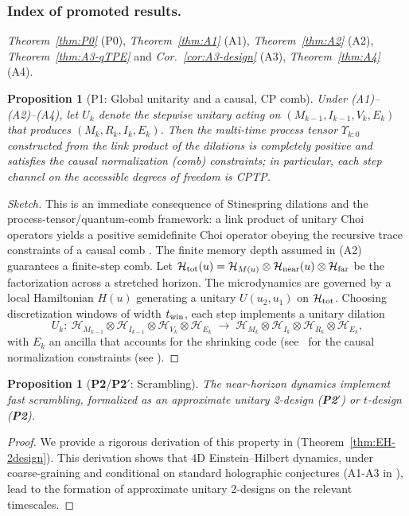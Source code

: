 \documentclass[aps,prd,preprint,onecolumn,superscriptaddress,nofootinbib,longbibliography,floatfix,11pt,showpacs,showkeys]{revtex4-2}
\newcommand{\Ptwo}{\textbf{P2}\xspace}
\newcommand{\PtwoPrime}{\textbf{P2$'$}\xspace}
\theoremstyle{plain}
\newtheorem{proposition}[theorem]{Proposition}
\theoremstyle{definition}
\theoremstyle{remark}
\begin{document}
\subsubsection{Index of promoted results.}
\textit{Theorem~\ref{thm:P0}} (P0), 
\textit{Theorem~\ref{thm:A1}} (A1),
\textit{Theorem~\ref{thm:A2}} (A2),
\textit{Theorem~\ref{thm:A3-qTPE}} and \textit{Cor.~\ref{cor:A3-design}} (A3),
\textit{Theorem~\ref{thm:A4}} (A4).


\begin{proposition}[P1: Global unitarity and a causal, CP comb]
\label{prop:P1-CP}
Under (A1)--(A2)--(A4), let $U_k$ denote the stepwise unitary acting on $(M_{k-1},I_{k-1},V_k,E_k)$ that produces $(M_k,R_k,I_k,E_k)$.
Then the multi-time process tensor $\Upsilon_{k:0}$ constructed from the link product of the dilations is completely positive and
satisfies the causal normalization (comb) constraints; in particular, each step channel on the accessible degrees of freedom is CPTP.
\end{proposition}
\begin{proof}[Sketch]
This is an immediate consequence of Stinespring dilations and the process-tensor/quantum-comb framework: a link product of unitary
Choi operators yields a positive semidefinite Choi operator obeying the recursive trace constraints of a causal comb
\cite{Chiribella:2009, Pollock:2018, Petz:1986}. The finite memory depth assumed in (A2) guarantees a finite-step comb.
Let $\mathcal{H}_{\rm tot}(u)=\mathcal{H}_{M(u)}\otimes\mathcal{H}_{\rm near}(u)\otimes\mathcal{H}_{\rm far}$ be the factorization across a stretched horizon. The microdynamics are governed by a local Hamiltonian $H(u)$ generating a unitary $U(u_2,u_1)$ on $\mathcal{H}_{\rm tot}$. Choosing discretization windows of width $t_{\rm win}$, each step implements a unitary dilation
\begin{equation}
U_k:\ \mathcal{H}_{M_{k-1}}\otimes\mathcal{H}_{I_{k-1}}\otimes\mathcal{H}_{V_k}\otimes\mathcal{H}_{E_k}
\;\longrightarrow\;
\mathcal{H}_{M_k}\otimes\mathcal{H}_{I_k}\otimes\mathcal{H}_{R_k}\otimes\mathcal{H}_{E_k},
\end{equation}
with $E_k$ an ancilla that accounts for the shrinking code (see~ for the causal normalization constraints (see ).
\end{proof}

\begin{proposition}[\Ptwo/\PtwoPrime: Scrambling]
\label{thm:P2-scrambling}
\label{prop:P2-scrambling}
The near-horizon dynamics implement fast scrambling, formalized as an approximate unitary 2-design (\PtwoPrime) or $t$-design (\Ptwo).
\end{proposition}
\begin{proof}
We provide a rigorous derivation of this property in  (Theorem~\ref{thm:EH-2design}). This derivation shows that 4D Einstein--Hilbert dynamics, under coarse-graining and conditional on standard holographic conjectures (A1-A3 in ), lead to the formation of approximate unitary 2-designs on the relevant timescales.
\end{proof}
\end{document}
